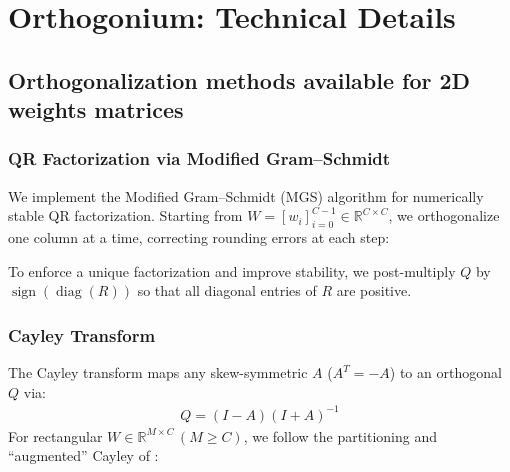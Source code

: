 \chapter{Orthogonium: Technical Details}
\label{app:orthogonium}

\section{Orthogonalization methods available for 2D weights matrices}
\label{ap:matrix_orth_methods}
\subsection{QR Factorization via Modified Gram–Schmidt}

We implement the Modified Gram–Schmidt (MGS) algorithm \cite{LaPlace1820} for numerically stable QR factorization.  Starting from \(W=[w_i]_{i=0}^{C-1}\in\mathbb{R}^{C\times C}\), we orthogonalize one column at a time, correcting rounding errors at each step:


To enforce a unique factorization and improve stability, we post-multiply \(Q\) by \(\operatorname{sign}(\operatorname{diag}(R))\) so that all diagonal entries of \(R\) are positive.

\subsection{Cayley Transform}

The Cayley transform \cite{Cayley_1846} maps any skew-symmetric \(A\) (\(A^T=-A\)) to an orthogonal \(Q\) via:
\begin{align*}
    Q = (I - A)(I + A)^{-1}
\end{align*}
For rectangular \(W\in\mathbb{R}^{M\times C}\,(M\ge C)\), we follow the partitioning and ``augmented'' Cayley of \cite{pauli2023lipschitz}:


